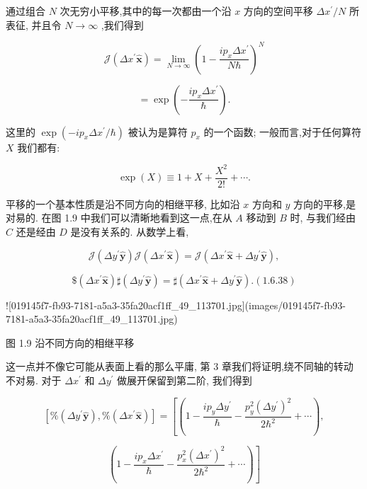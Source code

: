 \documentclass[lang=cn,newtx,10pt,scheme=chinese,thmcnt=section]{elegantbook}
\begin{document}
通过组合 $N$ 次无穷小平移,其中的每一次都由一个沿 $x$ 方向的空间平移 $\Delta {x}^{\prime }/N$ 所表征, 并且令 $N \rightarrow \infty$ ,我们得到

$$
\mathcal{J}\left( {\Delta {x}^{\prime }\widehat{\mathbf{x}}}\right) = \mathop{\lim }\limits_{{N \rightarrow \infty }}{\left( 1 - \frac{i{p}_{x}\Delta {x}^{\prime }}{N\hbar }\right) }^{N} \tag{1.6.36}
$$

$$
= \exp \left( {-\frac{i{p}_{x}\Delta {x}^{\prime }}{\hbar }}\right) .
$$

这里的 $\exp \left( {-i{p}_{x}\Delta {x}^{\prime }/\hbar }\right)$ 被认为是算符 ${p}_{x}$ 的一个函数; 一般而言,对于任何算符 $X$ 我们都有:

$$
\exp \left( X\right) \equiv 1 + X + \frac{{X}^{2}}{2!} + \cdots . \tag{1.6.37}
$$

平移的一个基本性质是沿不同方向的相继平移, 比如沿 $x$ 方向和 $y$ 方向的平移,是对易的. 在图 1.9 中我们可以清晰地看到这一点,在从 $A$ 移动到 $B$ 时, 与我们经由 $C$ 还是经由 $D$ 是没有关系的. 从数学上看,

$$
\mathcal{J}\left( {\Delta {y}^{\prime }\widehat{\mathbf{y}}}\right) \mathcal{J}\left( {\Delta {x}^{\prime }\widehat{\mathbf{x}}}\right) = \mathcal{J}\left( {\Delta {x}^{\prime }\widehat{\mathbf{x}} + \Delta {y}^{\prime }\widehat{\mathbf{y}}}\right) ,
$$

$$
\$ \left( {\Delta {x}^{\prime }\widehat{\mathbf{x}}}\right) \sharp \left( {\Delta {y}^{\prime }\widehat{\mathbf{y}}}\right) = \sharp \left( {\Delta {x}^{\prime }\widehat{\mathbf{x}} + \Delta {y}^{\prime }\widehat{\mathbf{y}}}\right) .\left( {1.6.38}\right) \tag{1. 6.38}
$$

![019145f7-fb93-7181-a5a3-35fa20acf1ff_49_113701.jpg](images/019145f7-fb93-7181-a5a3-35fa20acf1ff_49_113701.jpg)

图 1.9 沿不同方向的相继平移

这一点并不像它可能从表面上看的那么平庸, 第 3 章我们将证明,绕不同轴的转动不对易. 对于 $\Delta {x}^{\prime }$ 和 $\Delta {y}^{\prime }$ 做展开保留到第二阶, 我们得到

$$
\left\lbrack {\% \left( {\Delta {y}^{\prime }\widehat{\mathbf{y}}}\right) ,\% \left( {\Delta {x}^{\prime }\widehat{\mathbf{x}}}\right) }\right\rbrack = \left\lbrack {\left( {1 - \frac{i{p}_{y}\Delta {y}^{\prime }}{\hbar } - \frac{{p}_{y}^{2}{\left( \Delta {y}^{\prime }\right) }^{2}}{2{\hbar }^{2}} + \cdots }\right) ,}\right.
$$

$$
\left. \left( {1 - \frac{i{p}_{x}\Delta {x}^{\prime }}{\hbar } - \frac{{p}_{x}^{2}{\left( \Delta {x}^{\prime }\right) }^{2}}{2{\hbar }^{2}} + \cdots }\right) \right\rbrack \tag{1.6.39}
$$
\end{document}
